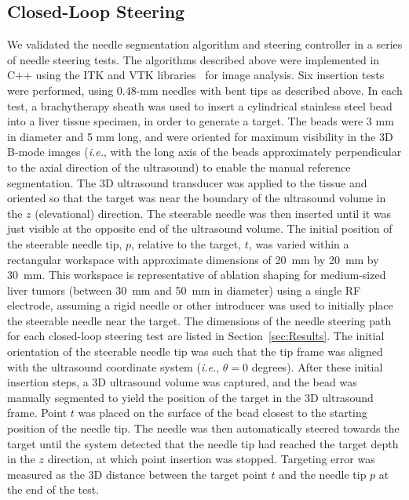 \subsection{Closed-Loop Steering}
We validated the needle segmentation algorithm and steering controller in a series of needle steering tests. The algorithms described above were implemented in C++ using the ITK and VTK libraries~\cite{ITK2002} for image analysis. Six insertion tests were performed, using 0.48-mm needles with bent tips as described above. In each test, a brachytherapy sheath was used to insert a cylindrical stainless steel bead into a liver tissue specimen, in order to generate a target. The beads were 3 mm in diameter and 5 mm long, and were oriented for maximum visibility in the 3D B-mode images (\textit{i.e.}, with the long axis of the beads approximately perpendicular to the axial direction of the ultrasound) to enable the manual reference segmentation. The 3D ultrasound transducer was applied to the tissue and oriented so that the target was near the boundary of the ultrasound volume in the $z$ (elevational) direction. The steerable needle was then inserted until it was just visible at the opposite end of the ultrasound volume. The initial position of the steerable needle tip, ${p}$, relative to the target, ${t}$, was varied within a rectangular workspace with approximate dimensions of 20~mm by 20~mm by 30~mm. This workspace is representative of ablation shaping for medium-sized liver tumors (between 30~mm and 50~mm in diameter) using a single RF electrode, assuming a rigid needle or other introducer was used to initially place the steerable needle near the target. The dimensions of the needle steering path for each closed-loop steering test are listed in Section~\ref{sec:Results}. The initial orientation of the steerable needle tip was such that the tip frame was aligned with the ultrasound coordinate system (\textit{i.e.}, $\theta = 0$ degrees). After these initial insertion steps, a 3D ultrasound volume was captured, and the bead was manually segmented to yield the position of the target in the 3D ultrasound frame. Point ${t}$ was placed on the surface of the bead closest to the starting position of the needle tip. The needle was then automatically steered towards the target until the system detected that the needle tip had reached the target depth in the $z$ direction, at which point insertion was stopped. Targeting error was measured as the 3D distance between the target point ${t}$ and the needle tip ${p}$ at the end of the test.


